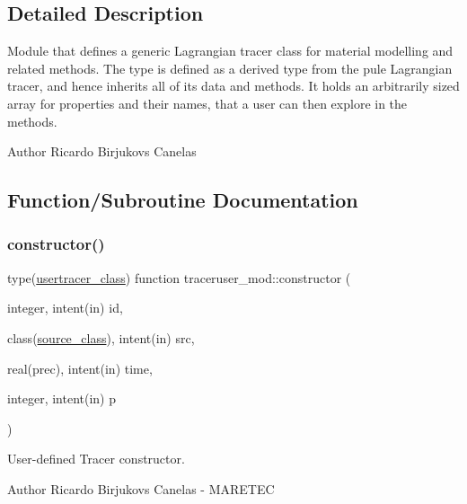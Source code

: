 \subsection{Detailed Description}
Module that defines a generic Lagrangian tracer class for material modelling and related methods. The type is defined as a derived type from the pule Lagrangian tracer, and hence inherits all of it\textquotesingle{}s data and methods. It holds an arbitrarily sized array for properties and their names, that a user can then explore in the methods. 

\begin{DoxyAuthor}{Author}
Ricardo Birjukovs Canelas 
\end{DoxyAuthor}


\subsection{Function/\+Subroutine Documentation}
\mbox{\label{namespacetraceruser__mod_a9b5d52bbc9611921275ff35fa82a91c5}} 
\subsubsection{\texorpdfstring{constructor()}{constructor()}}
{\footnotesize\ttfamily type(\mbox{\hyperlink{structtraceruser__mod_1_1usertracer__class}{usertracer\+\_\+class}}) function traceruser\+\_\+mod\+::constructor (\begin{DoxyParamCaption}\item[{integer, intent(in)}]{id,  }\item[{class(\mbox{\hyperlink{structsources__mod_1_1source__class}{source\+\_\+class}}), intent(in)}]{src,  }\item[{real(prec), intent(in)}]{time,  }\item[{integer, intent(in)}]{p }\end{DoxyParamCaption})\hspace{0.3cm}{\ttfamily [private]}}



User-\/defined Tracer constructor. 

\begin{DoxyAuthor}{Author}
Ricardo Birjukovs Canelas -\/ M\+A\+R\+E\+T\+EC 
\end{DoxyAuthor}

